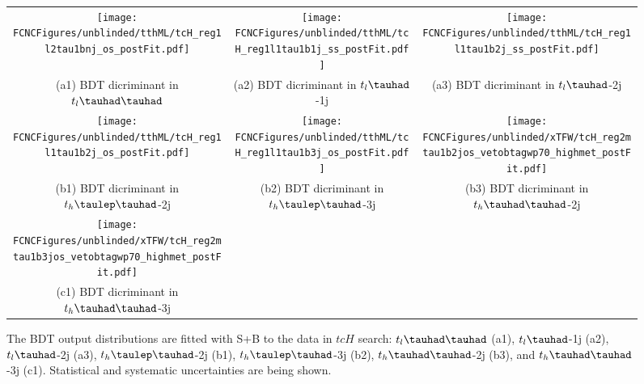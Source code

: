 \begin{figure}[H]
\begin{tabular}{@{}ccc@{}}
\texttt{[image: \\FCNCFigures/unblinded/tthML/tcH\_reg1l2tau1bnj\_os\_postFit.pdf]}&
\texttt{[image: \\FCNCFigures/unblinded/tthML/tcH\_reg1l1tau1b1j\_ss\_postFit.pdf]}&
\texttt{[image: \\FCNCFigures/unblinded/tthML/tcH\_reg1l1tau1b2j\_ss\_postFit.pdf]}\\
(a1) BDT dicriminant in $t_l\thadhad$ & (a2) BDT dicriminant in  $t_l\tauhad$-1j& (a3) BDT dicriminant in $t_l\tauhad$-2j\\
\texttt{[image: \\FCNCFigures/unblinded/tthML/tcH\_reg1l1tau1b2j\_os\_postFit.pdf]}&
\texttt{[image: \\FCNCFigures/unblinded/tthML/tcH\_reg1l1tau1b3j\_os\_postFit.pdf]}&
\texttt{[image: \\FCNCFigures/unblinded/xTFW/tcH\_reg2mtau1b2jos\_vetobtagwp70\_highmet\_postFit.pdf]}\\
(b1) BDT dicriminant in $t_h\tlhad$-2j & (b2) BDT dicriminant in  $t_h\tlhad$-3j & (b3) BDT dicriminant in $t_h\thadhad$-2j \\
\texttt{[image: \\FCNCFigures/unblinded/xTFW/tcH\_reg2mtau1b3jos\_vetobtagwp70\_highmet\_postFit.pdf]}& \\
(c1) BDT dicriminant in$t_h\thadhad$-3j\\
\end{tabular}
\caption{ The BDT output distributions are fitted with S+B to the data in $tcH$ search: $t_l\thadhad$ (a1),  $t_l\tauhad$-1j (a2),  $t_l\tauhad$-2j (a3),
  $t_h\tlhad$-2j (b1), $t_h\tlhad$-3j (b2), $t_h\thadhad$-2j (b3), and $t_h\thadhad$-3j (c1). Statistical and systematic uncertainties are being shown.}
\label{fig:asimov_postfitbdtHc}
\end{figure}

